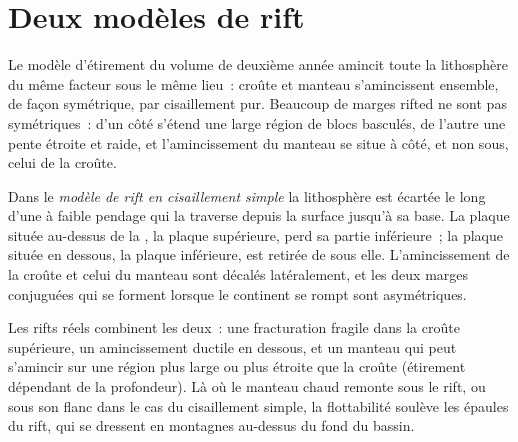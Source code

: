\section{Deux modèles de rift}\label{sec:b3:extension-strike-slip:models}

Le modèle d'étirement du volume de deuxième année amincit toute la lithosphère
du même facteur sous le même lieu~: croûte et manteau s'amincissent ensemble,
de façon symétrique, par cisaillement pur. Beaucoup de marges rifted ne sont
pas symétriques~: d'un côté s'étend une large région de blocs basculés, de l'autre une pente étroite et raide, et l'amincissement du manteau se situe
à côté, et non sous, celui de la croûte.

\begin{definition}\label{def:b3:extension-strike-slip:rift-models}
Dans le \emph{modèle de rift en cisaillement simple}
la lithosphère est écartée le long d'une  à faible pendage
qui la traverse depuis la surface jusqu'à sa base. La plaque située au-dessus
de la , la plaque supérieure, perd sa partie inférieure~;
la plaque située en dessous, la plaque inférieure, est retirée de sous elle.
L'amincissement de la croûte et celui du manteau sont décalés latéralement,
et les deux marges conjuguées qui se forment lorsque le continent se rompt sont asymétriques.
\end{definition}

Les rifts réels combinent les deux~: une fracturation fragile dans la croûte
supérieure, un amincissement ductile en dessous, et un manteau qui peut s'amincir
sur une région plus large ou plus étroite que la croûte (étirement dépendant
de la profondeur). Là où le manteau chaud remonte sous le rift, ou sous son flanc
dans le cas du cisaillement simple, la flottabilité soulève les épaules du rift, qui se dressent en montagnes au-dessus du fond du bassin.

